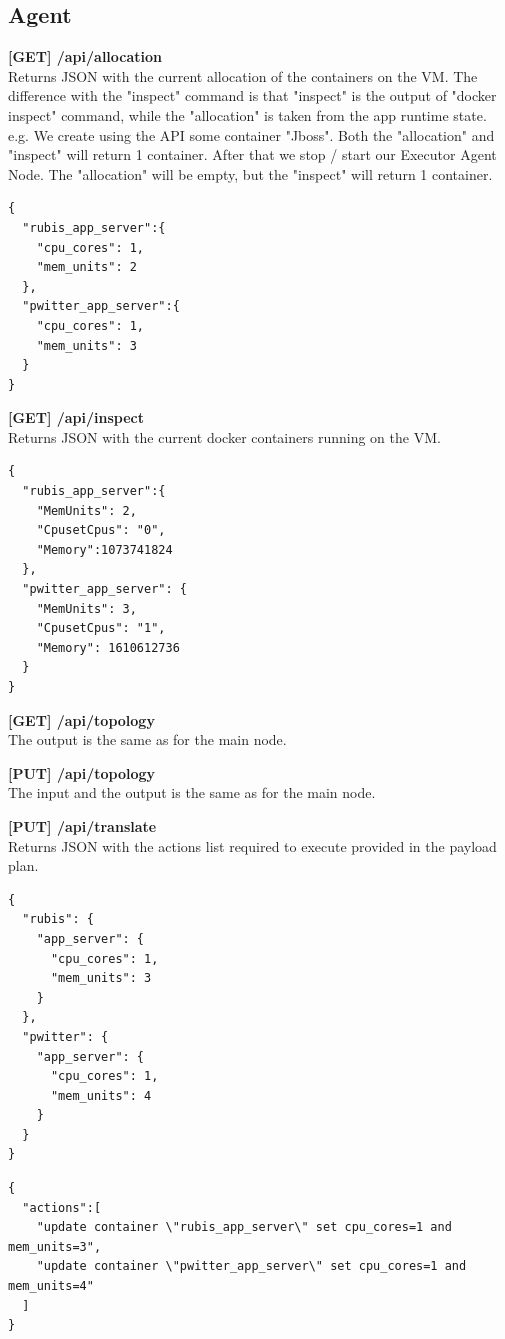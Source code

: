\subsection{Agent}
\textbf{[GET] /api/allocation} \\
Returns JSON with the current allocation of the containers on the VM. The difference with the "inspect" command is that
"inspect" is the output of "docker inspect" command, while the "allocation" is taken from the app runtime state. e.g. We
create using the API some container "Jboss". Both the "allocation" and "inspect" will return 1 container. After that we 
stop / start our Executor Agent Node. The "allocation" will be empty, but the "inspect" will return 1 container.
\begin{lstlisting}[caption=Example GET allocation output,basicstyle=\tiny]
{  
  "rubis_app_server":{  
    "cpu_cores": 1,
    "mem_units": 2
  },
  "pwitter_app_server":{
    "cpu_cores": 1,
    "mem_units": 3
  }
}
\end{lstlisting}

\vspace{5mm}
\noindent\textbf{[GET] /api/inspect} \\
Returns JSON with the current docker containers running on the VM.
\begin{lstlisting}[caption=Example GET inspect output,basicstyle=\tiny]
{  
  "rubis_app_server":{  
    "MemUnits": 2,
    "CpusetCpus": "0",
    "Memory":1073741824
  },
  "pwitter_app_server": {  
    "MemUnits": 3,
    "CpusetCpus": "1",
    "Memory": 1610612736
  }
}
\end{lstlisting}

\vspace{5mm}
\noindent\textbf{[GET] /api/topology} \\
The output is the same as for the main node.

\vspace{5mm}
\noindent\textbf{[PUT] /api/topology} \\
The input and the output is the same as for the main node.

\vspace{5mm}
\noindent\textbf{[PUT] /api/translate} \\
Returns JSON with the actions list required to execute provided in the payload plan.
\begin{lstlisting}[caption=Example of the input payload,basicstyle=\tiny]
{
  "rubis": {
    "app_server": {
      "cpu_cores": 1,
      "mem_units": 3
    }
  },
  "pwitter": {
    "app_server": {
      "cpu_cores": 1,
      "mem_units": 4  
    }
  }
}
\end{lstlisting}
\begin{lstlisting}[caption=Example of the output,basicstyle=\tiny]
{  
  "actions":[  
    "update container \"rubis_app_server\" set cpu_cores=1 and mem_units=3",
    "update container \"pwitter_app_server\" set cpu_cores=1 and mem_units=4"
  ]
}
\end{lstlisting}

